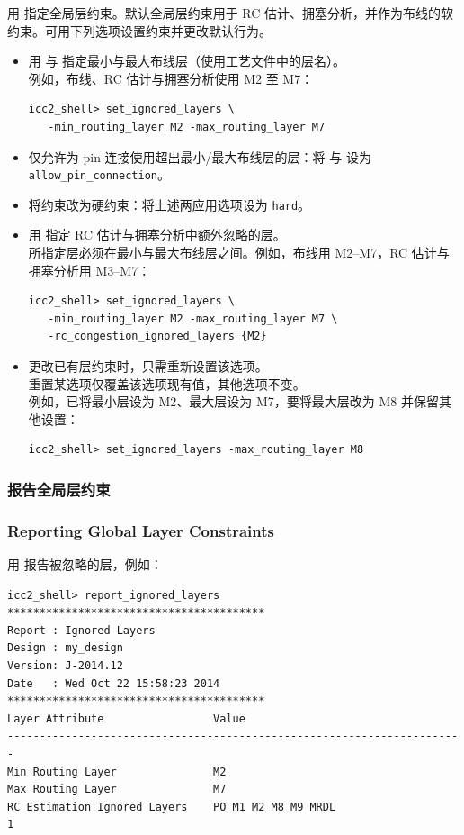 用  指定全局层约束。默认全局层约束用于 RC 估计、拥塞分析，并作为布线的软约束。可用下列选项设置约束并更改默认行为。
\begin{itemize}
  \item 用  与  指定最小与最大布线层（使用工艺文件中的层名）。\\
        例如，布线、RC 估计与拥塞分析使用 M2 至 M7：
\begin{lstlisting}
icc2_shell> set_ignored_layers \
   -min_routing_layer M2 -max_routing_layer M7
\end{lstlisting}
  \item 仅允许为 pin 连接使用超出最小/最大布线层的层：将  与  设为 \texttt{allow\_pin\_connection}。
  \item 将约束改为硬约束：将上述两应用选项设为 \texttt{hard}。
  \item 用  指定 RC 估计与拥塞分析中额外忽略的层。\\
        所指定层必须在最小与最大布线层之间。例如，布线用 M2--M7，RC 估计与拥塞分析用 M3--M7：
\begin{lstlisting}
icc2_shell> set_ignored_layers \
   -min_routing_layer M2 -max_routing_layer M7 \
   -rc_congestion_ignored_layers {M2}
\end{lstlisting}
  \item 更改已有层约束时，只需重新设置该选项。\\
        重置某选项仅覆盖该选项现有值，其他选项不变。\\
        例如，已将最小层设为 M2、最大层设为 M7，要将最大层改为 M8 并保留其他设置：
\begin{lstlisting}
icc2_shell> set_ignored_layers -max_routing_layer M8
\end{lstlisting}
\end{itemize}

\subsubsection{报告全局层约束}
\subsubsection*{Reporting Global Layer Constraints}

用  报告被忽略的层，例如：
\begin{lstlisting}
icc2_shell> report_ignored_layers
****************************************
Report : Ignored Layers
Design : my_design
Version: J-2014.12
Date   : Wed Oct 22 15:58:23 2014
****************************************
Layer Attribute                 Value
-----------------------------------------------------------------------
Min Routing Layer               M2
Max Routing Layer               M7
RC Estimation Ignored Layers    PO M1 M2 M8 M9 MRDL
1
\end{lstlisting}

